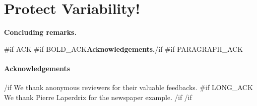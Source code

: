 \documentclass{sig-alternate}
\begin{document}
\section{Protect Variability!}
\label{sec:summary}


% 

\textbf{Concluding remarks.}
\label{sec:conclusion}


{{#if ACK}}
{{#if BOLD_ACK}}\textbf{Acknowledgements.}{{/if}}
{{#if PARAGRAPH_ACK}}\paragraph{Acknowledgements}{{/if}} We thank anonymous reviewers for their valuable feedbacks. %
{{#if LONG_ACK}} We thank Pierre Laperdrix for the newspaper example. {{/if}}
{{/if}}
%
\scriptsize

  
%
%

\end{document}
